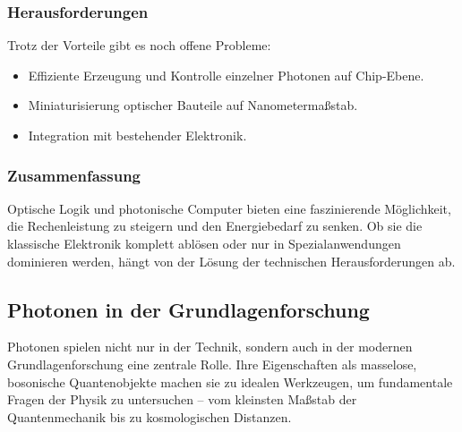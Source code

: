 \subsubsection{Herausforderungen}

Trotz der Vorteile gibt es noch offene Probleme:
\begin{itemize}
	\item Effiziente Erzeugung und Kontrolle einzelner Photonen auf Chip-Ebene.
	\item Miniaturisierung optischer Bauteile auf Nanometermaßstab.
	\item Integration mit bestehender Elektronik.
\end{itemize}

\subsubsection{Zusammenfassung}

Optische Logik und photonische Computer bieten eine faszinierende Möglichkeit, die Rechenleistung zu steigern und den Energiebedarf zu senken. Ob sie die klassische Elektronik komplett ablösen oder nur in Spezialanwendungen dominieren werden, hängt von der Lösung der technischen Herausforderungen ab.
\newpage
\noindent
\subsection{Photonen in der Grundlagenforschung}

Photonen spielen nicht nur in der Technik, sondern auch in der modernen Grundlagenforschung eine zentrale Rolle. 
Ihre Eigenschaften als masselose, bosonische Quantenobjekte machen sie zu idealen Werkzeugen, um fundamentale Fragen der Physik zu untersuchen – vom kleinsten Maßstab der Quantenmechanik bis zu kosmologischen Distanzen.

